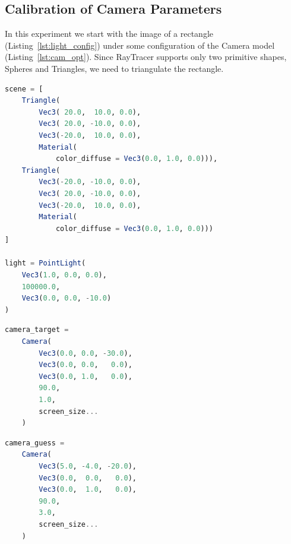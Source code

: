 \documentclass{juliacon}
\begin{document}
\subsection{Calibration of Camera Parameters}
\label{sec:calcam}

In this experiment we start with the image of a rectangle (Listing~\ref{lst:light_config}) under some configuration of the Camera model (Listing~\ref{lst:cam_opt}). Since RayTracer supports only two primitive shapes, Spheres and Triangles, we need to triangulate the rectangle.

\begin{lstlisting}[caption = {Configuration of the Scene for Experiment~\ref{sec:calcam}},
                   label = {lst:light_config},
                   captionpos = b,
                   language = Julia]
scene = [
    Triangle(
        Vec3( 20.0,  10.0, 0.0),
        Vec3( 20.0, -10.0, 0.0),
        Vec3(-20.0,  10.0, 0.0),
        Material(
            color_diffuse = Vec3(0.0, 1.0, 0.0))),
    Triangle(
        Vec3(-20.0, -10.0, 0.0),
        Vec3( 20.0, -10.0, 0.0),
        Vec3(-20.0,  10.0, 0.0),
        Material(
            color_diffuse = Vec3(0.0, 1.0, 0.0)))
]

light = PointLight(
    Vec3(1.0, 0.0, 0.0),
    100000.0,
    Vec3(0.0, 0.0, -10.0)
)
\end{lstlisting}

\noindent
\begin{minipage}{\linewidth}
\begin{lstlisting}[caption = {Camera Parameters to be Reconstructed},
                   label = {lst:cam_opt},
                   captionpos = b,
                   language = Julia]
camera_target =
    Camera(
        Vec3(0.0, 0.0, -30.0),
        Vec3(0.0, 0.0,   0.0),
        Vec3(0.0, 1.0,   0.0),
        90.0,
        1.0,
        screen_size...
    )
\end{lstlisting}
\end{minipage}

\noindent
\begin{minipage}{\linewidth}
\begin{lstlisting}[caption = {Initial Guess of the Camera Parameters},
                   label = {lst:cam_initial},
                   captionpos = b,
                   language = Julia]
camera_guess =
    Camera(
        Vec3(5.0, -4.0, -20.0),
        Vec3(0.0,  0.0,   0.0),
        Vec3(0.0,  1.0,   0.0),
        90.0,
        3.0,
        screen_size...
    )
\end{lstlisting}
\end{minipage}
\end{document}
